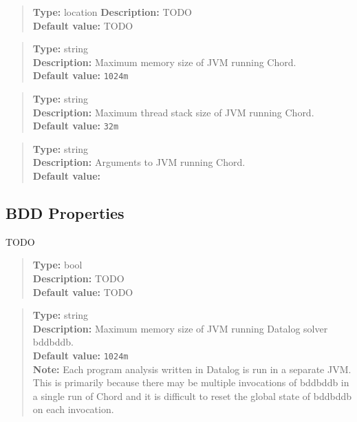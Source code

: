 \begin{quote}
{\bf Type:} location
{\bf Description:} TODO \\
{\bf Default value:} TODO
\end{quote}

\begin{quote}
{\bf Type:} string \\
{\bf Description:} Maximum memory size of JVM running Chord. \\
{\bf Default value:} {\tt 1024m}
\end{quote}

\begin{quote}
{\bf Type:} string \\
{\bf Description:} Maximum thread stack size of JVM running Chord. \\
{\bf Default value:} {\tt 32m}
\end{quote}

\begin{quote}
{\bf Type:} string \\
{\bf Description:} Arguments to JVM running Chord. \\
{\bf Default value:}    
\end{quote}

\subsection{BDD Properties}
\label{sec:bdd-props}

TODO
\\[10pt]

\begin{quote}
{\bf Type:} bool \\
{\bf Description:} TODO \\
{\bf Default value:} TODO
\end{quote}

\begin{quote}
{\bf Type:} string \\
{\bf Description:} Maximum memory size of JVM running Datalog solver bddbddb. \\
{\bf Default value:} {\tt 1024m} \\
{\bf Note:}  Each program analysis written in Datalog is run in a separate JVM.  This is primarily because there may be multiple invocations of bddbddb in a single run of Chord and it is difficult to reset the global state of bddbddb on each invocation. 
\end{quote}


